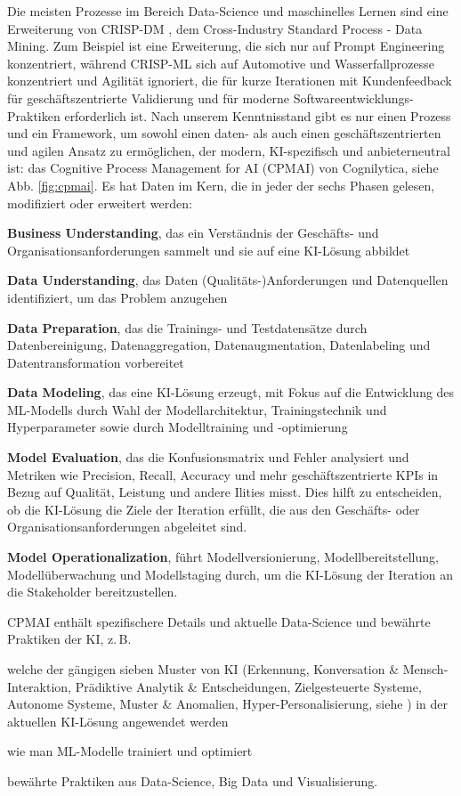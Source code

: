 \documentclass[twocolumn]{article}
\begin{document}
Die meisten Prozesse im Bereich Data-Science und maschinelles Lernen sind eine Erweiterung von CRISP-DM \cite{CRISP99}, dem Cross-Industry Standard Process - Data Mining. Zum Beispiel ist \cite{Farago23} eine Erweiterung, die sich nur auf Prompt Engineering konzentriert, während CRISP-ML \cite{Studer21} sich auf Automotive und Wasserfallprozesse konzentriert und Agilität ignoriert, die für kurze Iterationen mit Kundenfeedback für geschäftszentrierte Validierung und für moderne Softwareentwicklungs-Praktiken erforderlich ist. Nach unserem Kenntnisstand gibt es nur einen Prozess und ein Framework, um sowohl einen daten- als auch einen geschäftszentrierten und agilen Ansatz zu ermöglichen, der modern, KI-spezifisch und anbieterneutral ist: das Cognitive Process Management for AI (CPMAI) von Cognilytica, siehe Abb. \ref{fig:cpmai}. Es hat Daten im Kern, die in jeder der sechs Phasen gelesen, modifiziert oder erweitert werden:
\begin{compactitem}
\item \textbf{Business Understanding}, das ein Verständnis der Geschäfts- und Organisationsanforderungen sammelt und sie auf eine KI-Lösung abbildet
\item \textbf{Data Understanding}, das Daten (Qualitäts-)Anforderungen und Datenquellen identifiziert, um das Problem anzugehen
\item \textbf{Data Preparation}, das die Trainings- und Testdatensätze durch Datenbereinigung, Datenaggregation, Datenaugmentation, Datenlabeling und Datentransformation vorbereitet
\item \textbf{Data Modeling}, das eine KI-Lösung erzeugt, mit Fokus auf die Entwicklung des ML-Modells durch Wahl der Modellarchitektur, Trainingstechnik und Hyperparameter sowie durch Modelltraining und -optimierung
\item \textbf{Model Evaluation}, das die Konfusionsmatrix und Fehler analysiert und Metriken wie Precision, Recall, Accuracy und mehr geschäftszentrierte KPIs in Bezug auf Qualität, Leistung und andere Ilities misst. Dies hilft zu entscheiden, ob die KI-Lösung die Ziele der Iteration erfüllt, die aus den Geschäfts- oder Organisationsanforderungen abgeleitet sind.
\item \textbf{Model Operationalization}, führt Modellversionierung, Modellbereitstellung, Modellüberwachung und Modellstaging durch, um die KI-Lösung der Iteration an die Stakeholder bereitzustellen.
\end{compactitem}

CPMAI enthält spezifischere Details und aktuelle Data-Science und bewährte Praktiken der KI, z.\,B.
\begin{compactitem}
\item welche der gängigen sieben Muster von KI (Erkennung, Konversation \& Mensch-Interaktion, Prädiktive Analytik \& Entscheidungen, Zielgesteuerte Systeme, Autonome Systeme, Muster \& Anomalien, Hyper-Personalisierung, siehe \cite{Cognilytica}) in der aktuellen KI-Lösung angewendet werden
\item wie man ML-Modelle trainiert und optimiert
\item bewährte Praktiken aus Data-Science, Big Data und Visualisierung.
\end{compactitem}
\end{document}

